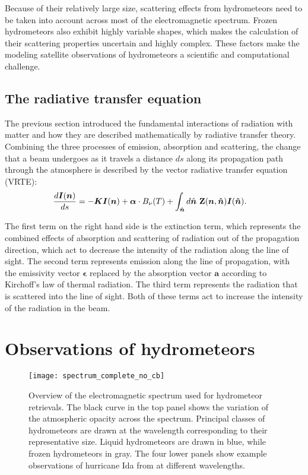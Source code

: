 Because of their relatively large size, scattering effects from hydrometeors
need to be taken into account across most of the electromagnetic spectrum.
Frozen hydrometeors also exhibit highly variable shapes, which makes the
calculation of their scattering properties uncertain and highly complex. These
factors make the modeling satellite observations of hydrometeors a scientific
and computational challenge.


\subsection{The radiative transfer equation}

The previous section introduced the fundamental interactions of radiation
with matter and how they are described mathematically by radiative transfer
theory. Combining the three processes of emission, absorption and scattering,
the change that a beam undergoes as it travels a distance $ds$ along its
propagation path through the atmosphere is described by the vector radiative
transfer equation (VRTE):
\begin{align}\label{eq:vrte}
  \frac{d\bm{I}(\bm{n})}{ds} &=
  -\bm{K}\bm{I}(\bm{n}) + \bm{\alpha} \cdot B_\nu(T) + \int_{\hat{\bm{n}}} d\hat{\bm{n}} \ \mathbf{Z}(\bm{n}, \bm{\hat{n}}) \bm{I}(\bm{\hat{n}}).
  \end{align}

The first term on the right hand side is the extinction term, which represents
the combined effects of absorption and scattering of radiation out of the
propagation direction, which act to decrease the intensity of the radiation
along the line of sight. The second term represents emission along the line of
propagation, with the emissivity vector $\bm{\epsilon}$ replaced by the
absorption vector $\bm{a}$ according to Kirchoff's law of thermal radiation.
The third term represents the radiation that is scattered into the line of
sight. Both of these terms act to increase the intensity of the radiation
in the beam. 

\section{Observations of hydrometeors}
%
\begin{figure}[!tbh]
  \centering
  \texttt{[image: spectrum\_complete\_no\_cb]}
  \caption{Overview of the electromagnetic spectrum used for hydrometeor
    retrievals. The black curve in the top panel shows the variation of the
    atmospheric opacity across the spectrum. Principal classes of hydrometeors
    are drawn at the wavelength corresponding to their representative size.
    Liquid hydrometeors are drawn in blue, while frozen hydrometeors in gray.
    The four lower panels show example observations of hurricane Ida from at
    different wavelengths.}
  \label{fig:radiative_transfer:spectrum}
\end{figure}

